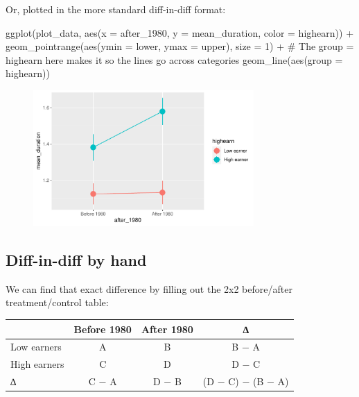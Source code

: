 \documentclass[
  letterpaper,
  DIV=11,
  numbers=noendperiod]{scrartcl}
\newenvironment{Shaded}{\begin{snugshade}}{\end{snugshade}}
\newcommand{\AttributeTok}[1]{\textcolor[rgb]{0.40,0.45,0.13}{#1}}
\newcommand{\CommentTok}[1]{\textcolor[rgb]{0.37,0.37,0.37}{#1}}
\newcommand{\DecValTok}[1]{\textcolor[rgb]{0.68,0.00,0.00}{#1}}
\newcommand{\FunctionTok}[1]{\textcolor[rgb]{0.28,0.35,0.67}{#1}}
\newcommand{\NormalTok}[1]{\textcolor[rgb]{0.00,0.23,0.31}{#1}}
\newcommand{\SpecialCharTok}[1]{\textcolor[rgb]{0.37,0.37,0.37}{#1}}
\begin{document}
Or, plotted in the more standard diff-in-diff format:

\begin{Shaded}
\begin{Highlighting}[]
\FunctionTok{ggplot}\NormalTok{(plot\_data, }\FunctionTok{aes}\NormalTok{(}\AttributeTok{x =}\NormalTok{ after\_1980, }\AttributeTok{y =}\NormalTok{ mean\_duration, }\AttributeTok{color =}\NormalTok{ highearn)) }\SpecialCharTok{+}
  \FunctionTok{geom\_pointrange}\NormalTok{(}\FunctionTok{aes}\NormalTok{(}\AttributeTok{ymin =}\NormalTok{ lower, }\AttributeTok{ymax =}\NormalTok{ upper), }\AttributeTok{size =} \DecValTok{1}\NormalTok{) }\SpecialCharTok{+}
  \CommentTok{\# The group = highearn here makes it so the lines go across categories}
  \FunctionTok{geom\_line}\NormalTok{(}\FunctionTok{aes}\NormalTok{(}\AttributeTok{group =}\NormalTok{ highearn))}
\end{Highlighting}
\end{Shaded}

\begin{figure}[H]

{\centering \includegraphics[width=0.75\textwidth,height=\textheight]{DD_wooldridge_injury_files/figure-pdf/plot-pointrange-manual-no-facet-1.pdf}

}

\end{figure}

\hypertarget{diff-in-diff-by-hand}{%
\subsection{Diff-in-diff by hand}\label{diff-in-diff-by-hand}}

We can find that exact difference by filling out the 2x2 before/after
treatment/control table:

\begin{longtable}[]{@{}lccc@{}}
\toprule()
& Before 1980 & After 1980 & ∆ \\
\midrule()
\endhead
Low earners & A & B & B − A \\
High earners & C & D & D − C \\
∆ & C − A & D − B & (D − C) − (B − A) \\
\bottomrule()
\end{longtable}
\end{document}
